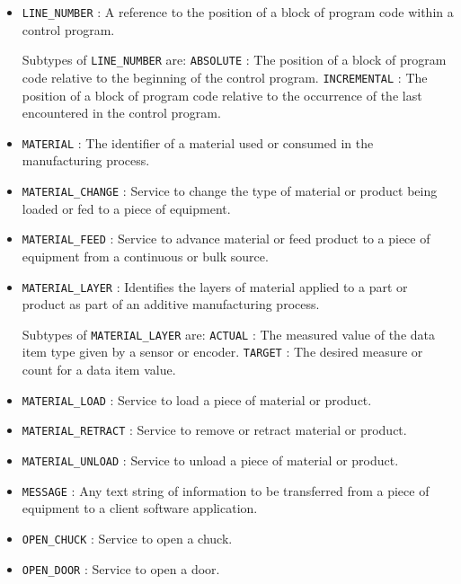 \begin{itemize}
\item \texttt{LINE_NUMBER} : A reference to the position of a block of program code within a control program. 

Subtypes of \texttt{LINE_NUMBER} are: 
\newline\tab \texttt{ABSOLUTE} : The position of a block of program code relative to the beginning of the control program. 
\newline\tab \texttt{INCREMENTAL} : The position of a block of program code relative to the occurrence of the last  encountered in the control program. 
\item \texttt{MATERIAL} : The identifier of a material used or consumed in the manufacturing process. 

\item \texttt{MATERIAL_CHANGE} : Service to change the type of material or product being loaded or fed to a piece of equipment. 

\item \texttt{MATERIAL_FEED} : Service to advance material or feed product to a piece of equipment from a continuous or bulk source. 

\item \texttt{MATERIAL_LAYER} : Identifies the layers of material applied to a part or product as part of an additive manufacturing process. 

Subtypes of \texttt{MATERIAL_LAYER} are: 
\newline\tab \texttt{ACTUAL} : The measured value of the data item type given by a sensor or encoder. 
\newline\tab \texttt{TARGET} : The desired measure or count for a data item value. 
\item \texttt{MATERIAL_LOAD} : Service to load a piece of material or product. 

\item \texttt{MATERIAL_RETRACT} : Service to remove or retract material or product. 

\item \texttt{MATERIAL_UNLOAD} : Service to unload a piece of material or product. 

\item \texttt{MESSAGE} : Any text string of information to be transferred from a piece of equipment to a client software application. 

\item \texttt{OPEN_CHUCK} : Service to open a chuck. 

\item \texttt{OPEN_DOOR} : Service to open a door. 


\end{itemize}
